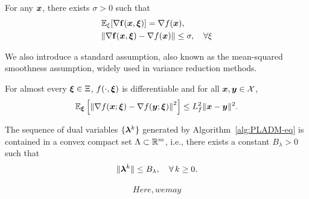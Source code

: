 \documentclass[10pt]{article}
\begin{document}
\begin{assumption}
     \label{Ass: unbiased gradient oracle} 
     For any \(\bm{x}\), there exists $\sigma > 0$ such that 
     \begin{align}
      &\mathbb{E}_{\xi}[\nabla \mathbf f(\bm{x}, \bm{\xi})] = \nabla f(\bm{x}), \notag \\
    & \| \nabla  \mathbf f(\bm{x}, \bm{\xi}) - \nabla f(\bm{x}) \| \leq \sigma, \quad \forall \xi
     \end{align}
\end{assumption}
We also introduce a standard assumption, also known as the mean-squared smoothness assumption, widely used in variance reduction methods.
\begin{assumption}
    \label{Ass: the expected smoothness of f} 
    For almost every $\bm{\xi} \in \Xi$, $f(\cdot, \bm{\xi})$ is differentiable and 
    for all $\bm{x}, \bm{y} \in \mathcal{X}$,
    \[
        \mathbb{E}_{\bm{\xi}}\left[\left\|\nabla f(\bm{x}; \bm{\xi}) - \nabla f(\bm{y}; \bm{\xi})\right\|^{2}
        \right] \leq L_f^{2}\|\bm{x} - \bm{y}\|^{2}.
    \]
\end{assumption}
\begin{assumption}
\label{Ass: bounded multiplier}
The sequence of dual variables $\{\bm{\lambda}^k\}$ generated by 
Algorithm~\ref{alg:PLADM-eq} is contained in a convex compact set 
$\Lambda \subset \mathbb{R}^m$, i.e., there exists a constant $B_\lambda > 0$ such that
\begin{equation}
    \|\bm{\lambda}^k\| \leq B_\lambda, \quad \forall\, k \geq 0.
\end{equation}
\end{assumption}
\begin{align}
    Here, we may
\end{align}
\end{document}

